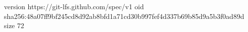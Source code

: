 version https://git-lfs.github.com/spec/v1
oid sha256:48a07ff9bf245cd8d92ab8bfd1a71cd30b997fef4d337b69b85d9a5b3f0ad89d
size 72
